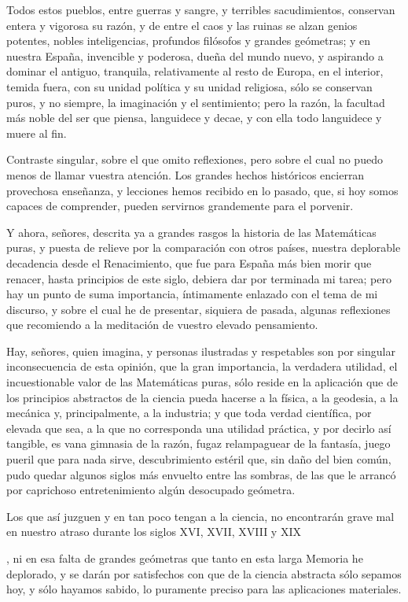 \documentclass[a4paper, 12pt]{article}
\begin{document}
{{{{Todos estos pueblos, entre guerras y sangre, y terribles sacudimientos, conservan entera y vigorosa su razón, y de entre el caos y las ruinas se alzan genios potentes, nobles inteligencias, profundos filósofos y grandes geómetras; y en nuestra España, invencible y poderosa, dueña del mundo nuevo, y aspirando a dominar el antiguo, tranquila, relativamente al resto de Europa, en el interior, temida fuera, con su unidad política y su unidad religiosa, sólo se conservan puros, y no siempre, la imaginación y el sentimiento; pero la razón, la facultad más noble del ser que piensa, languidece y decae, y con ella todo languidece y muere al fin.

Contraste singular, sobre el que omito reflexiones, pero sobre el cual no puedo menos de llamar vuestra atención.  Los grandes hechos históricos encierran provechosa enseñanza, y lecciones hemos recibido en lo pasado, que, si hoy somos capaces de comprender, pueden servirnos grandemente para el porvenir.

Y ahora, señores, descrita ya a grandes rasgos la historia de las Matemáticas puras, y puesta de relieve por la comparación con otros países, nuestra deplorable decadencia desde el Renacimiento, que fue para España más bien morir que renacer, hasta principios de este siglo, debiera dar por terminada mi tarea; pero hay un punto de suma importancia, íntimamente enlazado con el tema de mi discurso, y sobre el cual he de presentar, siquiera de pasada, algunas reflexiones que recomiendo a la meditación de vuestro elevado pensamiento.

Hay, señores, quien imagina, y personas ilustradas y respetables son por singular inconsecuencia de esta opinión, que la gran importancia, la verdadera utilidad, el incuestionable valor de las Matemáticas puras, sólo reside en la aplicación que de los principios abstractos de la ciencia pueda hacerse a la física, a la geodesia, a la mecánica y, principalmente, a la industria; y que toda verdad científica, por elevada que sea, a la que no corresponda una utilidad práctica, y por decirlo así tangible, es vana gimnasia de la razón, fugaz relampaguear de la fantasía, juego pueril que para nada sirve, descubrimiento estéril que, sin daño del bien común, pudo quedar algunos siglos más envuelto entre las sombras, de las que le arrancó por caprichoso entretenimiento algún desocupado geómetra.

Los que así juzguen y en tan poco tengan a la ciencia, no encontrarán grave mal en nuestro atraso durante los siglos XVI, XVII, XVIII y XIX}, ni en esa falta de grandes geómetras que tanto en esta larga Memoria he deplorado, y se darán por satisfechos con que de la ciencia abstracta sólo sepamos hoy, y sólo hayamos sabido, lo puramente preciso para las aplicaciones materiales.

}}}
\end{document}
